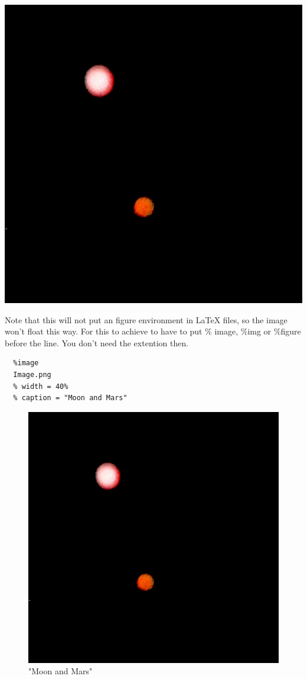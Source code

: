 \documentclass{article}
\begin{document}
\includegraphics[height=.40\textheight]{Image.png}

Note that this will not put an figure environment in \LaTeX
files, so the image won't float this way. For this to
achieve to have to put \% image, \%img or \%figure before the
line. You don't need the extention then.

\begin{verbatim}
  %image
  Image.png
  % width = 40%
  % caption = "Moon and Mars"

\end{verbatim}

\begin{figure}[hbt]
\includegraphics[width=.40\linewidth]{Image.png}
\caption{"Moon and Mars"}
\end{figure}
\end{document}
